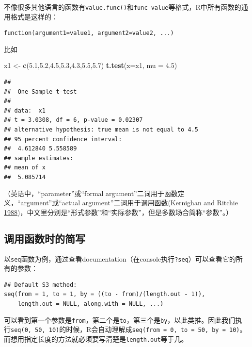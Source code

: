 \documentclass[]{book}
\newenvironment{Shaded}{\begin{snugshade}}{\end{snugshade}}
\newcommand{\DataTypeTok}[1]{\textcolor[rgb]{0.13,0.29,0.53}{#1}}
\newcommand{\FloatTok}[1]{\textcolor[rgb]{0.00,0.00,0.81}{#1}}
\newcommand{\KeywordTok}[1]{\textcolor[rgb]{0.13,0.29,0.53}{\textbf{#1}}}
\newcommand{\NormalTok}[1]{#1}
\newcommand{\StringTok}[1]{\textcolor[rgb]{0.31,0.60,0.02}{#1}}
\begin{document}
不像很多其他语言的函数有\texttt{value.func()}和\texttt{func\ value}等格式，R中所有函数的通用格式是这样的：

\begin{verbatim}
function(argument1=value1, argument2=value2, ...)
\end{verbatim}

比如

\begin{Shaded}
\begin{Highlighting}[]
\NormalTok{x1 <-}\StringTok{ }\KeywordTok{c}\NormalTok{(}\FloatTok{5.1}\NormalTok{,}\FloatTok{5.2}\NormalTok{,}\FloatTok{4.5}\NormalTok{,}\FloatTok{5.3}\NormalTok{,}\FloatTok{4.3}\NormalTok{,}\FloatTok{5.5}\NormalTok{,}\FloatTok{5.7}\NormalTok{)}
\KeywordTok{t.test}\NormalTok{(}\DataTypeTok{x=}\NormalTok{x1, }\DataTypeTok{mu =} \FloatTok{4.5}\NormalTok{)}
\end{Highlighting}
\end{Shaded}

\begin{verbatim}
## 
##  One Sample t-test
## 
## data:  x1
## t = 3.0308, df = 6, p-value = 0.02307
## alternative hypothesis: true mean is not equal to 4.5
## 95 percent confidence interval:
##  4.612840 5.558589
## sample estimates:
## mean of x 
##  5.085714
\end{verbatim}

（英语中，``parameter''或``formal argument''二词用于函数定义，``argument''或``actual argument''二词用于调用函数(Kernighan and Ritchie \protect\hyperlink{ref-Kernighan1988The-C-Programming-La}{1988})，中文里分别是``形式参数''和``实际参数''，但是多数场合简称``参数''。）

\hypertarget{abbr}{%
\subsection{调用函数时的简写}\label{abbr}}

以\texttt{seq}函数为例，通过查看documentation（在console执行\texttt{?seq}）可以查看它的所有的参数：

\begin{verbatim}
## Default S3 method:
seq(from = 1, to = 1, by = ((to - from)/(length.out - 1)),
    length.out = NULL, along.with = NULL, ...)
\end{verbatim}

可以看到第一个参数是\texttt{from}，第二个是\texttt{to}，第三个是\texttt{by}，以此类推。因此我们执行\texttt{seq(0,\ 50,\ 10)}的时候，R会自动理解成\texttt{seq(from\ =\ 0,\ to\ =\ 50,\ by\ =\ 10)}。而想用指定长度的方法就必须要写清楚是\texttt{length.out}等于几。
\end{document}
